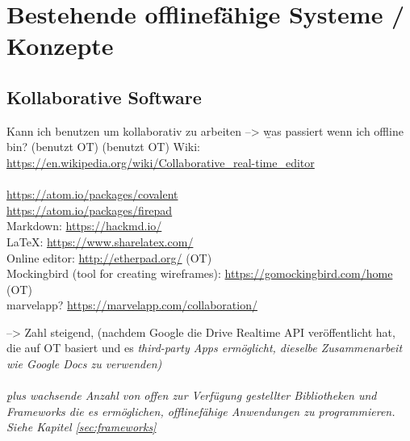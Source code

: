 \chapter{\label{chap:state}Bestehende offlinefähige Systeme / Konzepte}
%
%
\section{Kollaborative Software}
  Kann ich benutzen um kollaborativ zu arbeiten --> \b{was passiert wenn ich offline bin?}
  (benutzt OT)
  (benutzt OT)
  Wiki: \url{https://en.wikipedia.org/wiki/Collaborative_real-time_editor}\\\\
  \url{https://atom.io/packages/covalent}\\
  \url{https://atom.io/packages/firepad}\\
  Markdown: \url{https://hackmd.io/}\\
  LaTeX: \url{https://www.sharelatex.com/}\\
  Online editor: \url{http://etherpad.org/} (OT)\\
  Mockingbird (tool for creating wireframes): \url{https://gomockingbird.com/home} (OT)\\
  marvelapp? \url{https://marvelapp.com/collaboration/}

  --> Zahl steigend, (nachdem Google die Drive Realtime API veröffentlicht hat, die auf \gls{OT} basiert und es \it{third-party Apps} ermöglicht, dieselbe Zusammenarbeit wie Google Docs zu verwenden)\\\\
  \b{plus} wachsende Anzahl von offen zur Verfügung gestellter Bibliotheken und Frameworks die es ermöglichen, offlinefähige Anwendungen zu programmieren. Siehe Kapitel \ref{sec:frameworks}
%
%
